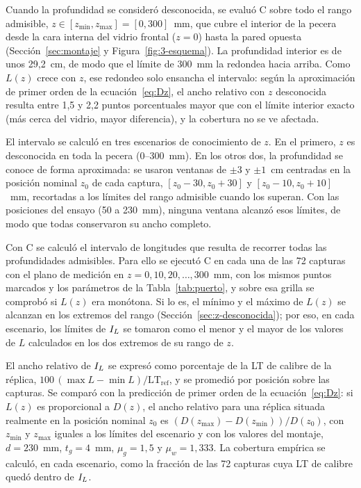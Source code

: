 Cuando la profundidad se consideró desconocida, se evaluó C sobre todo el rango admisible, $z \in [z_{\min}, z_{\max}] = [0, 300]$~mm, que cubre el interior de la pecera desde la cara interna del vidrio frontal ($z = 0$) hasta la pared opuesta (Sección~\ref{sec:montaje} y Figura~\ref{fig:3-esquema}). La profundidad interior es de unos 29,2~cm, de modo que el límite de 300~mm la redondea hacia arriba. Como $L(z)$ crece con $z$, ese redondeo solo ensancha el intervalo: según la aproximación de primer orden de la ecuación~\eqref{eq:Dz}, el ancho relativo con $z$ desconocida resulta entre 1,5 y 2,2 puntos porcentuales mayor que con el límite interior exacto (más cerca del vidrio, mayor diferencia), y la cobertura no se ve afectada.

El intervalo se calculó en tres escenarios de conocimiento de $z$. En el primero, $z$ es desconocida en toda la pecera (0--300~mm). En los otros dos, la profundidad se conoce de forma aproximada: se usaron ventanas de $\pm 3$ y $\pm 1$~cm centradas en la posición nominal $z_0$ de cada captura, $[z_0 - 30, z_0 + 30]$ y $[z_0 - 10, z_0 + 10]$~mm, recortadas a los límites del rango admisible cuando los superan. Con las posiciones del ensayo (50 a 230~mm), ninguna ventana alcanzó esos límites, de modo que todas conservaron su ancho completo.

Con C se calculó el intervalo de longitudes que resulta de recorrer todas las profundidades admisibles. Para ello se ejecutó C en cada una de las 72 capturas con el plano de medición en $z = 0, 10, 20, \ldots, 300$~mm, con los mismos puntos marcados y los parámetros de la Tabla~\ref{tab:puerto}, y sobre esa grilla se comprobó si $L(z)$ era monótona. Si lo es, el mínimo y el máximo de $L(z)$ se alcanzan en los extremos del rango (Sección~\ref{sec:z-desconocida}); por eso, en cada escenario, los límites de $I_L$ se tomaron como el menor y el mayor de los valores de $L$ calculados en los dos extremos de su rango de $z$.

El ancho relativo de $I_L$ se expresó como porcentaje de la LT de calibre de la réplica, $100\,(\max L - \min L)/\mathrm{LT}_{\mathrm{ref}}$, y se promedió por posición sobre las capturas. Se comparó con la predicción de primer orden de la ecuación~\eqref{eq:Dz}: si $L(z)$ es proporcional a $D(z)$, el ancho relativo para una réplica situada realmente en la posición nominal $z_0$ es $(D(z_{\max}) - D(z_{\min}))/D(z_0)$, con $z_{\min}$ y $z_{\max}$ iguales a los límites del escenario y con los valores del montaje, $d = 230$~mm, $t_g = 4$~mm, $\mu_g = 1{,}5$ y $\mu_w = 1{,}333$. La cobertura empírica se calculó, en cada escenario, como la fracción de las 72 capturas cuya LT de calibre quedó dentro de $I_L$.

